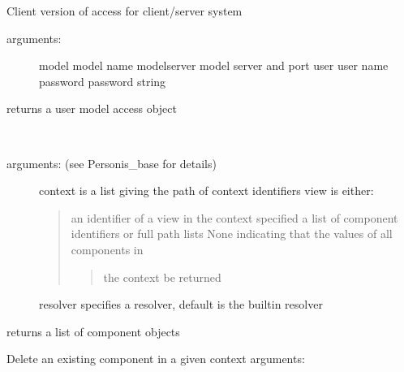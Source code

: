 \documentclass[letterpaper,10pt,english]{sphinxmanual}
\begin{document}
\label{API:module-personis.client}

\begin{fulllineitems}
\label{API:personis.client.Access}
Client version of access for client/server system
\begin{description}
\item[{arguments:}] \leavevmode
model           model name
modelserver     model server and port
user            user name
password        password string

\end{description}

returns a user model access object

\begin{fulllineitems}
\label{API:personis.client.Access.ask}~\begin{description}
\item[{arguments: (see Personis\_base for details)}] \leavevmode
context is a list giving the path of context identifiers
view is either:
\begin{quote}

an identifier of a view in the context specified
a list of component identifiers or full path lists
None indicating that the values of all components in
\begin{quote}

the context be returned
\end{quote}
\end{quote}

resolver specifies a resolver, default is the builtin resolver

\end{description}

returns a list of component objects

\end{fulllineitems}


\begin{fulllineitems}
\label{API:personis.client.Access.delcomponent}
Delete an existing component in a given context
arguments:
\begin{quote}


\end{quote}
\end{fulllineitems}
\end{fulllineitems}
\end{document}
